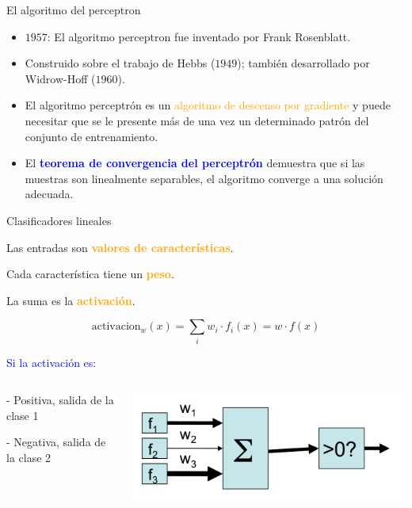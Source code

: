 \documentclass[11pt]{beamer}
\begin{document}
\begin{frame}{El algoritmo del perceptron}
\begin{itemize}
	\item $1957$: El algoritmo perceptron fue inventado por Frank Rosenblatt.
	\item Construido sobre el trabajo de Hebbs ($1949$); tambi\'en desarrollado por Widrow-Hoff ($1960$).
	\item El algoritmo perceptr\'on es un \textcolor{orange}{algoritmo de descenso por gradiente} y puede necesitar que se le presente m\'as de una vez un determinado patr\'on del conjunto de  entrenamiento. 
	
	\item El \textcolor{blue}{\textbf{teorema de convergencia del perceptr\'on}} demuestra que si las muestras son linealmente separables, el algoritmo converge a una soluci\'on adecuada.
\end{itemize}
\end{frame}

\begin{frame}{Clasificadores lineales}
\begin{itemize}
\small{
\item Las entradas son \textcolor{orange}{\textbf{valores de caracter\'isticas}}.

\item Cada caracter\'istica tiene un \textcolor{orange}{\textbf{peso}}.

\item  La suma es la \textcolor{orange}{\textbf{activaci\'on}}.

\[
\text{activacion}_w(x) = \sum_iw_i\cdot f_i(x) = w\cdot f(x)
\]

\item \textcolor{blue}{Si la activaci\'on es:}
\begin{columns}
\begin{column}{0.55\textwidth}
	
\qquad - \small {Positiva, salida de la clase 1}
			
\qquad - \small {Negativa, salida de la clase 2 }
\end{column}
	\begin{column}{0.45\textwidth}  
		\includegraphics[scale= 0.32]{TA10.png}
		
	\end{column}
\end{columns}

}
\end{itemize}
\end{frame}
\end{document}
